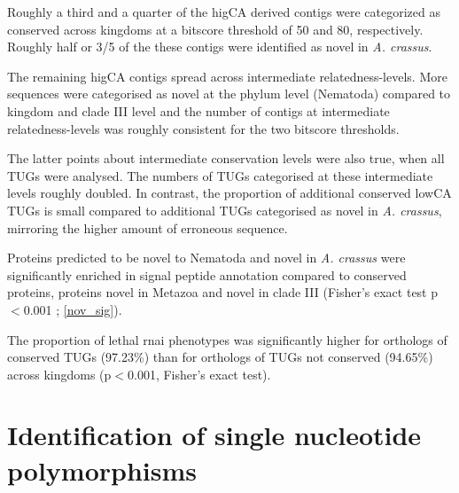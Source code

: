 \afterpage{\clearpage}

Roughly a third and a quarter of the higCA derived contigs were
categorized as conserved across kingdoms at a bitscore threshold of 50
and 80, respectively. Roughly half or 3/5 of the these contigs were
identified as novel in \textit{A. crassus}.

The remaining higCA contigs spread across intermediate
relatedness-levels. More sequences were categorised as novel at the
phylum level (Nematoda) compared to kingdom and clade III level and
the number of contigs at intermediate relatedness-levels was roughly
consistent for the two bitscore thresholds.

The latter points about intermediate conservation levels were also
true, when all TUGs were analysed. The numbers of TUGs categorised at
these intermediate levels roughly doubled. In contrast, the proportion
of additional conserved lowCA TUGs is small compared to additional
TUGs categorised as novel in \textit{A. crassus}, mirroring the higher
amount of erroneous sequence.

Proteins predicted to be novel to Nematoda and novel in
\textit{A. crassus} were significantly enriched in signal peptide
annotation compared to conserved proteins, proteins novel in Metazoa
and novel in clade III (Fisher's exact test p$<$0.001 ;
\ref{nov_sig}).


The proportion of lethal rnai phenotypes was significantly higher for
orthologs of conserved TUGs (97.23\%) than for orthologs of TUGs not
conserved (94.65\%) across kingdoms (p$<$0.001, Fisher's exact test).

\section{Identification of single nucleotide polymorphisms}

